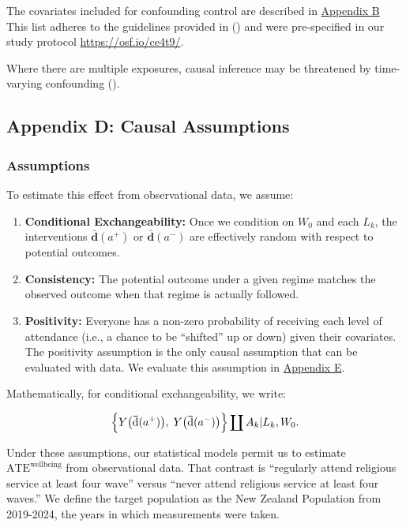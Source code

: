 \documentclass[
  single column]{article}
\providecommand{\tightlist}{%
  \setlength{\itemsep}{0pt}\setlength{\parskip}{0pt}}\usepackage{longtable,booktabs,array}
\begin{document}
The covariates included for confounding control are described in
\hyperref[appendix-baseline]{Appendix B} This list adheres to the
guidelines provided in () and were pre-specified in our study protocol
\url{https://osf.io/ce4t9/}.

Where there are multiple exposures, causal inference may be threatened
by time-varying confounding
().

\newpage{}

\subsection{Appendix D: Causal Assumptions}\label{appendix-assumptions}

\subsubsection{Assumptions}\label{assumptions}

To estimate this effect from observational data, we assume:

\begin{enumerate}
\def\labelenumi{\arabic{enumi}.}
\tightlist
\item
  \textbf{Conditional Exchangeability:} Once we condition on \(W_0\) and
  each \(L_k\), the interventions
  \(\boldsymbol{\bar{\boldsymbol{\text{d}}}}(a^+)\) or
  \(\boldsymbol{\bar{\boldsymbol{\text{d}}}}(a^-)\) are effectively
  random with respect to potential outcomes.
\item
  \textbf{Consistency:} The potential outcome under a given regime
  matches the observed outcome when that regime is actually followed.
\item
  \textbf{Positivity:} Everyone has a non-zero probability of receiving
  each level of attendance (i.e., a chance to be ``shifted'' up or down)
  given their covariates. The positivity assumption is the only causal
  assumption that can be evaluated with data. We evaluate this
  assumption in \hyperref[appendix-transition]{Appendix E}.
\end{enumerate}

Mathematically, for conditional exchangeability, we write:

\[
\Bigl\{
  Y\bigl(\boldsymbol{\bar{\boldsymbol{\text{d}}}}(a^+)\bigr), 
  \; 
  Y\bigl(\boldsymbol{\bar{\boldsymbol{\text{d}}}}(a^-)\bigr)
\Bigr\}
\coprod
A_k |
L_k,
W_0.
\]

Under these assumptions, our statistical models permit us to estimate
\(\text{ATE}^{\text{wellbeing}}\) from observational data. That contrast
is ``regularly attend religious service at least four wave'' versus
``never attend religious service at least four waves.'' We define the
target population as the New Zealand Population from 2019-2024, the
years in which measurements were taken.
\end{document}

